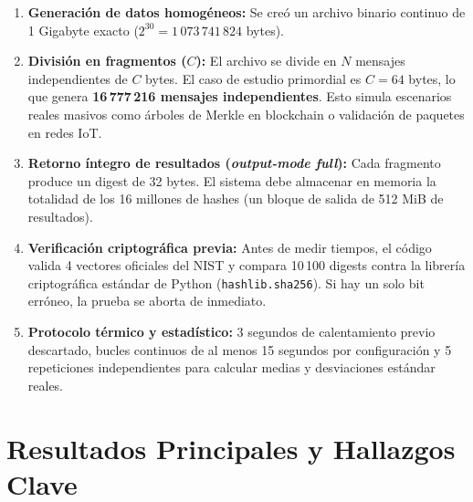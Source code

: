 \documentclass[11pt,a4paper]{article}
\begin{document}
\begin{enumerate}[leftmargin=*]
    \item \textbf{Generación de datos homogéneos:} Se creó un archivo binario continuo de 1 Gigabyte exacto ($2^{30} = 1\,073\,741\,824$ bytes).
    \item \textbf{División en fragmentos ($C$):} El archivo se divide en $N$ mensajes independientes de $C$ bytes. El caso de estudio primordial es $C = 64$ bytes, lo que genera \textbf{16\,777\,216 mensajes independientes}. Esto simula escenarios reales masivos como árboles de Merkle en blockchain o validación de paquetes en redes IoT.
    \item \textbf{Retorno íntegro de resultados (\emph{output-mode full}):} Cada fragmento produce un digest de 32 bytes. El sistema debe almacenar en memoria la totalidad de los 16 millones de hashes (un bloque de salida de 512 MiB de resultados).
    \item \textbf{Verificación criptográfica previa:} Antes de medir tiempos, el código valida 4 vectores oficiales del NIST y compara 10\,100 digests contra la librería criptográfica estándar de Python (\texttt{hashlib.sha256}). Si hay un solo bit erróneo, la prueba se aborta de inmediato.
    \item \textbf{Protocolo térmico y estadístico:} 3 segundos de calentamiento previo descartado, bucles continuos de al menos 15 segundos por configuración y 5 repeticiones independientes para calcular medias y desviaciones estándar reales.
\end{enumerate}

\section{Resultados Principales y Hallazgos Clave}
\end{document}

